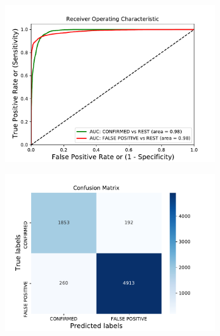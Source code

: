 \begin{figure}[H]
                \centering
                \begin{subfigure}{.49\textwidth}
                \includegraphics[width = 1\textwidth]{data/bGB_overfit_roc.pdf}
                \end{subfigure}
                \begin{subfigure}{.49\textwidth}
                \includegraphics[width = 1\textwidth]{data/bGB_overfit_cm.pdf}
                \end{subfigure}
                \begin{subfigure}{.49\textwidth}

\end{subfigure}
\end{figure}
